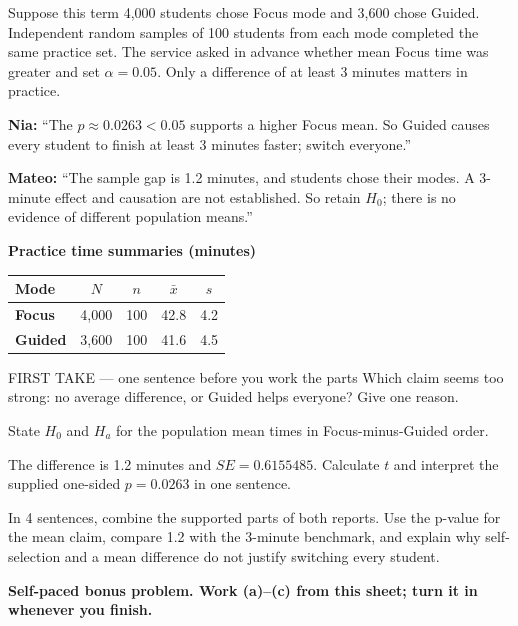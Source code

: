 \documentclass[14pt]{extarticle}
\begin{document}
\pagestyle{empty}


\noindent\begin{minipage}[t]{0.57\linewidth}
\vspace{0pt}
Suppose this term 4{,}000 students chose Focus mode and 3{,}600 chose Guided. Independent random samples of 100 students from each mode completed the same practice set. The service asked in advance whether mean Focus time was greater and set $\alpha=0.05$. Only a difference of at least 3 minutes matters in practice.\par\smallskip \textbf{Nia:} ``The $p\approx0.0263<0.05$ supports a higher Focus mean. So Guided causes every student to finish at least 3 minutes faster; switch everyone.''\par \textbf{Mateo:} ``The sample gap is 1.2 minutes, and students chose their modes. A 3-minute effect and causation are not established. So retain $H_0$; there is no evidence of different population means.''\par
\end{minipage}\hfill
\begin{minipage}[t]{0.40\linewidth}
\vspace{0pt}
\begin{center}
\textbf{Practice time summaries (minutes)}\par\smallskip
\begin{tabular}{|l|c|c|c|c|}
\hline
\textbf{Mode} & \textbf{$N$} & \textbf{$n$} & \textbf{$\bar x$} & \textbf{$s$} \\ \hline
\textbf{Focus} & 4{,}000 & 100 & 42.8 & 4.2 \\ \hline
\textbf{Guided} & 3{,}600 & 100 & 41.6 & 4.5 \\ \hline
\end{tabular}
\end{center}
\end{minipage}

\begin{firsttakebox}{FIRST TAKE --- one sentence before you work the parts}
Which claim seems too strong: no average difference, or Guided helps everyone? Give one reason.
\end{firsttakebox}

\begin{description}[leftmargin=1.15in, labelwidth=1in, itemsep=2pt, topsep=2pt]
  \item[\dokbadge{1}~(a)] State $H_0$ and $H_a$ for the population mean times in Focus-minus-Guided order.
  \item[\dokbadge{2}~(b)] The difference is 1.2 minutes and $SE=0.6155485$. Calculate $t$ and interpret the supplied one-sided $p=0.0263$ in one sentence.
  \item[\dokbadge{3}~(c)] In 4 sentences, combine the supported parts of both reports. Use the p-value for the mean claim, compare 1.2 with the 3-minute benchmark, and explain why self-selection and a mean difference do not justify switching every student.
\end{description}

\vfill
\textbf{Self-paced bonus problem. Work (a)--(c) from this sheet; turn it in whenever you finish.}
\end{document}
